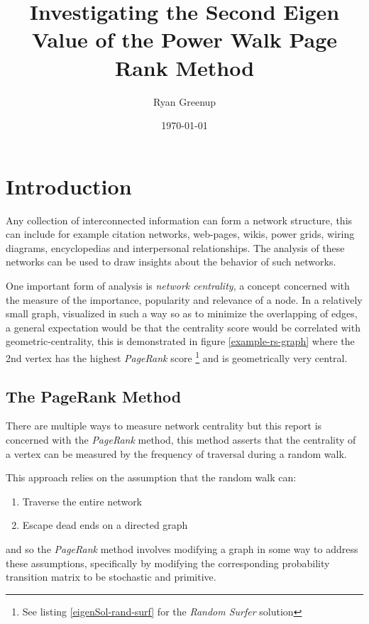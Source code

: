 \documentclass[11pt]{report}
\author{Ryan Greenup}
\date{\today}
\title{Investigating the Second Eigen Value of the Power Walk Page Rank Method}
\begin{document}
\maketitle
\tableofcontents



\section{Introduction}
\label{sec:org93e4f0c}
Any collection of interconnected information can form a network structure,
this can include for example citation networks, web-pages, wikis, power grids, wiring diagrams, encyclopedias and interpersonal
relationships. The analysis of these networks can be used to draw insights about
the behavior of such networks.

One important form of analysis is \emph{network centrality}, a concept concerned with
the measure of the importance, popularity and relevance of a node. In a
relatively small graph, visualized in such a way so as to minimize the
overlapping of edges, a general expectation would be that the centrality score
would be correlated with geometric-centrality, this is demonstrated in figure
\ref{example-rs-graph} where the 2nd vertex has the highest \emph{PageRank} score \footnote{See listing \ref{eigenSol-rand-surf} for the \textit{Random Surfer} solution } and
is geometrically very central.

\subsection{The PageRank Method}
\label{sec:org9a3667e}

There are multiple ways to measure network centrality but this report is
concerned with the \emph{PageRank} method, this method asserts that the centrality of
a vertex can be measured by the frequency of traversal during a random walk.

This approach relies on the assumption that the random walk can:

\begin{enumerate}
\item Traverse the entire network
\item Escape dead ends on a directed graph
\end{enumerate}


and so the \emph{PageRank} method involves modifying a graph in some way to address
these assumptions, specifically by modifying the corresponding probability
transition matrix to be stochastic and primitive.
\end{document}
